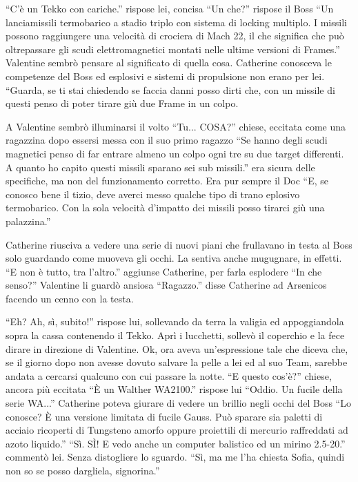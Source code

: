     ``C'è un Tekko con cariche.'' rispose lei, concisa ``Un che?'' rispose il Boss ``Un lanciamissili termobarico a stadio triplo con
    sistema di locking multiplo. I missili possono raggiungere una velocità di crociera di Mach 22, il che significa che
    può oltrepassare gli scudi elettromagnetici montati nelle ultime versioni di Frames.'' Valentine sembrò pensare al
    significato di quella cosa. Catherine conosceva le competenze del Boss ed esplosivi e sistemi di propulsione non
    erano per lei. ``Guarda, se ti stai chiedendo se faccia danni posso dirti che, con un missile di questi penso di
    poter tirare giù due Frame in un colpo.

    A Valentine sembrò illuminarsi il volto ``Tu... COSA?'' chiese, eccitata come una ragazzina dopo essersi messa con
    il suo primo ragazzo ``Se hanno degli scudi magnetici penso di far entrare almeno un colpo ogni tre su due target
    differenti. A quanto ho capito questi missili sparano sei sub missili.'' era sicura delle specifiche, ma non del
    funzionamento corretto. Era pur sempre il Doc ``E, se conosco bene il tizio, deve averci messo qualche tipo di trano
    eplosivo termobarico. Con la sola velocità d'impatto dei missili posso tirarci giù una palazzina.''

    Catherine riusciva a vedere una serie di nuovi piani che frullavano in testa al Boss solo guardando come muoveva gli
    occhi. La sentiva anche mugugnare, in effetti. ``E non è tutto, tra l'altro.'' aggiunse Catherine, per farla
    esplodere ``In che senso?'' Valentine li guardò ansiosa ``Ragazzo.'' disse Catherine ad Arsenicos facendo un cenno
    con la testa.

    ``Eh? Ah, sì, subito!'' rispose lui, sollevando da terra la valigia ed appoggiandola sopra la cassa contenendo il
    Tekko. Aprì i lucchetti, sollevò il coperchio e la fece dirare in direzione di Valentine. Ok, ora aveva
    un'espressione tale che diceva che, se il giorno dopo non avesse dovuto salvare la pelle a lei ed al suo Team,
    sarebbe andata a cercarsi qualcuno con cui passare la notte. ``E questo cos'è?'' chiese, ancora più eccitata ``È un
    Walther WA2100.'' rispose lui ``Oddio. Un fucile della serie WA...'' Catherine poteva giurare di vedere un brillio
    negli occhi del Boss ``Lo conosce? È una versione limitata di fucile Gauss. Può sparare sia paletti di acciaio
    ricoperti di Tungsteno amorfo oppure proiettili di mercurio raffreddati ad azoto liquido.'' ``Sì. SÌ! E vedo anche
    un computer balistico ed un mirino 2.5-20.'' commentò lei. Senza distogliere lo sguardo. ``Sì, ma me l'ha chiesta
    Sofia, quindi non so se posso dargliela, signorina.''

